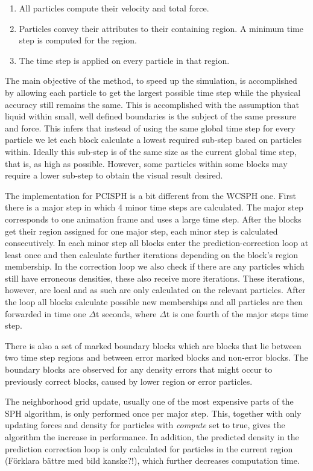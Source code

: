 \documentclass[../../main.tex]{subfiles}
\begin{document}
\begin{enumerate}
\item All particles compute their velocity and total force. 
\item Particles convey their attributes to their containing region. A minimum time step is computed for the region. 
\item The time step is applied on every particle in that region. 
\end{enumerate}

The main objective of the method, to speed up the simulation, is accomplished by allowing each particle to get the largest possible time step while the physical accuracy still remains the same. This is accomplished with the assumption that liquid within small, well defined boundaries is the subject of the same pressure and force. This infers that instead of using the same global time step for every particle we let each block calculate a lowest required sub-step based on particles within. Ideally this sub-step is of the same size as the current global time step, that is, as high as possible. However, some particles within some blocks may require a lower sub-step to obtain the visual result desired. 

The implementation for PCISPH is a bit different from the WCSPH one. First there is a major step in which 4 minor time steps are calculated. The major step corresponds to one animation frame and uses a large time step. After the blocks get their region assigned for one major step, each minor step is calculated consecutively. In each minor step all blocks enter the prediction-correction loop at least once and then calculate further iterations depending on the block's region membership. In the correction loop we also check if there are any particles which still have erroneous densities, these also receive more iterations. These iterations, however, are local and as such are only calculated on the relevant particles. After the loop all blocks calculate possible new memberships and all particles are then forwarded in time one $\Delta$t seconds, where $\Delta$t is one fourth of the major steps time step. 

There is also a set of marked boundary blocks which are blocks that lie between two time step regions and between error marked blocks and non-error blocks. The boundary blocks are observed for any density errors that might occur to previously correct blocks, caused by lower region or error particles. 

The neighborhood grid update, usually one of the most expensive parts of the SPH algorithm, is only performed once per major step. This, together with only updating forces and density for particles with \textit{compute} set to true, gives the algorithm the increase in performance. In addition, the predicted density in the prediction correction loop is only calculated for particles in the current region (Förklara bättre med bild kanske?!), which further decreases computation time. 
\end{document}

